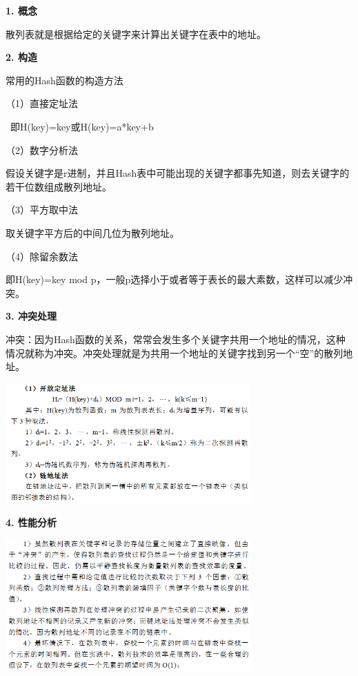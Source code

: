 {\textbf{1. 概念}}

{散列表就是根据给定的关键字来计算出关键字在表中的地址。}

{\textbf{2. 构造}}

{常用的Hash函数的构造方法}

{（1）直接定址法}

{~即H(key)=key或H(key)=a*key+b}

{（2）数字分析法}

{假设关键字是r进制，并且Hash表中可能出现的关键字都事先知道，则去关键字的若干位数组成散列地址。}

{（3）平方取中法}

{取关键字平方后的中间几位为散列地址。}

{（4）除留余数法}

{即H(key)=key mod
p，{一般p选择小于或者等于表长的最大素数}，这样可以减少冲突。}

{\textbf{3. 冲突处理}}

{冲突：因为Hash函数的关系，常常会发生多个关键字共用一个地址的情况，这种情况就称为冲突。冲突处理就是为共用一个地址的关键字找到另一个``空''的散列地址。}

\includegraphics[width=3.70833in,height=1.81250in]{png-jpeg-pics/AB38936DEDE13BE2CB95F5C0E3081756.png}

{\textbf{4. 性能分析}}

{\includegraphics[width=3.70833in,height=1.97917in]{png-jpeg-pics/9716B27691E0F50D520BD597E56948C0.png}}
